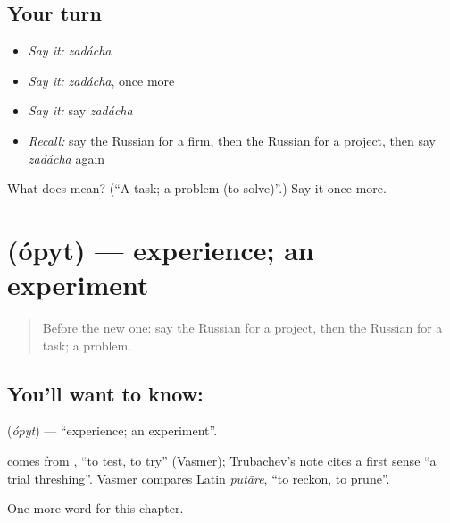 \subsection*{Your turn}
\begin{itemize}
\raggedright
  \item \emph{Say it:} \emph{zadácha}
  \item \emph{Say it:} \emph{zadácha}, once more
  \item \emph{Say it:} say \emph{zadácha}
  \item \emph{Recall:} say the Russian for a firm, then the Russian for a project, then say \emph{zadácha} again
\end{itemize}

\begin{tcolorbox}[breakable,colback=teal!4,colframe=teal!35!black,title={Before you move on}]
What does  mean? (\textquotedblleft{}A task; a problem (to solve)\textquotedblright{}.) Say it once more.
\end{tcolorbox}
\section[\texorpdfstring{\ru{опыт} (ópyt)}{опыт (ópyt)}]{ (ópyt) — experience; an experiment}

\label{lesson:RU-C257-opyt}



\begin{quote}
Before the new one: say the Russian for a project, then the Russian for a task; a problem.
\end{quote}

\subsection*{You'll want to know: }
\textbf{} (\emph{ópyt}) — \textquotedblleft{}experience; an experiment\textquotedblright{}.

\begin{cousinweb}
\textbf{} comes from \emph{}, \textquotedblleft{}to test, to try\textquotedblright{} (Vasmer); Trubachev's note cites a first sense \textquotedblleft{}a trial threshing\textquotedblright{}. Vasmer compares Latin \emph{putāre}, \textquotedblleft{}to reckon, to prune\textquotedblright{}.
\end{cousinweb}

\begin{grammarlens}[title={What you've built}]
One more word for this chapter.
\end{grammarlens}

